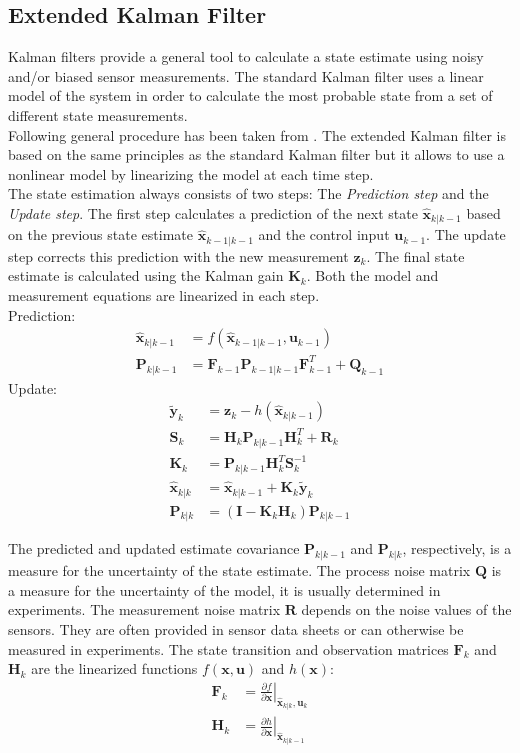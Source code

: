 \subsection{Extended Kalman Filter}
Kalman filters provide a general tool to calculate a state estimate using noisy and/or biased sensor measurements. The standard Kalman filter uses a linear model of the system in order to calculate the most probable state from a set of different state measurements.\\
Following general procedure has been taken from \cite{Bar-Shalom}.
The extended Kalman filter is based on the same principles as the standard Kalman filter but it allows to use a nonlinear model by linearizing the model at each time step.\\
The state estimation always consists of two steps: The \emph{Prediction step} and the \emph{Update step}. The first step calculates a prediction of the next state $\hat{\bm{x}}_{k|k-1}$ based on the previous state estimate $\hat{\bm{x}}_{k-1|k-1}$ and the control input $\bm{u}_{k-1}$. The update step corrects this prediction with the new measurement $\bm{z}_k$. The final state estimate is calculated using the Kalman gain $\bm{K}_k$. Both the model and measurement equations are linearized in each step.\\
Prediction:
\begin{align}
\hat{\bm{x}}_{k|k-1} &= f(\hat{\bm{x}}_{k-1|k-1},\bm{u}_{k-1})\\
\bm{P}_{k|k-1} &= \bm{F}_{k-1} \bm{P}_{k-1|k-1} \bm{F}_{k-1}^T + \bm{Q}_{k-1}
\end{align}
Update:
\begin{align}
\tilde{\bm{y}}_k &= \bm{z}_k - h(\hat{\bm{x}}_{k|k-1})\\
\bm{S}_k &= \bm{H}_k \bm{P}_{k|k-1} \bm{H}_k^T + \bm{R}_k\\
\bm{K}_k &= \bm{P}_{k|k-1}\bm{H}_k^T \bm{S}_k^{-1}\\
\hat{\bm{x}}_{k|k} &= \hat{\bm{x}}_{k|k-1} + \bm{K}_k \tilde{\bm{y}}_k\\
\bm{P}_{k|k} &= (\bm{I}-\bm{K}_k \bm{H}_k)\bm{P}_{k|k-1}
\end{align}

The predicted and updated estimate covariance $\bm{P}_{k|k-1}$ and $\bm{P}_{k|k}$, respectively, is a measure for the uncertainty of the state estimate. The process noise matrix $\bm{Q}$ is a measure for the uncertainty of the model, it is usually determined in experiments. The measurement noise matrix $\bm{R}$ depends on the noise values of the sensors. They are often provided in sensor data sheets or can otherwise be measured in experiments. The state transition and observation matrices $\bm F_k$ and $\bm{H}_k$ are the linearized functions $f(\bm{x},\bm{u})$ and $h(\bm{x})$:
\begin{align}
\bm{F}_k &= \left. \frac{\partial f}{\partial \bm{x}} \right|_{\hat{\bm{x}}_{k|k},\bm{u}_k}\\
\bm{H}_k &= \left. \frac{\partial h}{\partial \bm{x}} \right|_{\hat{\bm{x}}_{k|k-1}}
\end{align}
